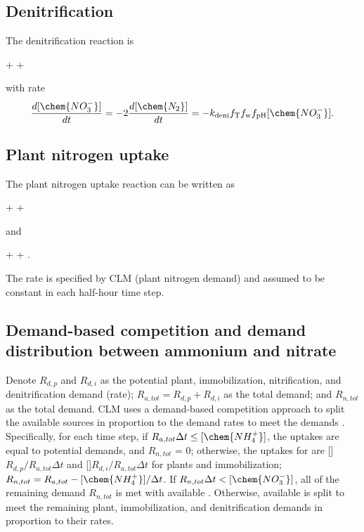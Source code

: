 \documentclass[gmd, manuscript]{copernicus}
\begin{document}
\subsection{Denitrification} 
The denitrification reaction is
\begin{reaction}
 + \cdots {}  + \cdots
\label{rxn:deni}
\end{reaction}
with rate \citep{Dickinson2002} 
\begin{equation} 
\frac{d [\chem{NO_3^-}]}{d t} = -2\frac{d
[\chem{N_2}]}{d t} = -k_\text{deni} f_\text{T} f_\text{w}
f_\text{pH}[\chem{NO_3^-}].
\label{eq:deni}
\end{equation}

\subsection{Plant nitrogen uptake}
The plant nitrogen uptake reaction can be written as
\begin{reaction}
 + \cdots \rightarrow {} + \cdots
\label{rxn:plantatake}
\end{reaction}
and
\begin{reaction}
 + \cdots \rightarrow {} + \cdots.
\label{rxn:plantntake}
\end{reaction}
The rate is specified by CLM (plant nitrogen demand) and assumed to be
constant in each half-hour time step. 

\subsection{Demand-based competition and demand distribution between ammonium and nitrate}
\label{sec:demandbasedcompetition}
Denote $R_{d,p}$ and $R_{d,i}$ as the potential plant,
immobilization, nitrification, and denitrification demand (rate);
$R_{a,tot}=R_{d,p}+R_{d,i}$ as the total  demand; and
$R_{n,tot}$ as the total  demand. CLM uses a demand-based
competition approach to split the available sources in proportion to the demand
rates to meet the demands \citep{Oleson2013,Thornton2005}. Specifically, for
each time step, if $R_{a,tot}\Delta t \leq [\chem{NH_4^+}]$, the uptakes are
equal to potential demands, and $R_{n,tot}$ = 0; otherwise, the uptakes for
 are []$R_{d,p}/R_{a,tot}\Delta t$ and
[]$R_{d,i}/R_{a,tot}\Delta t$ for plants and immobilization; $R_{n,tot}=R_{a,tot}-[\chem{NH_4^+}]/\Delta t$. If $R_{n,tot}\Delta t < [\chem{NO_3^-}]$, all of the remaining
demand $R_{n,tot}$ is met with available . Otherwise, available
 is split to meet the remaining plant, immobilization, and
denitrification demands in proportion to their rates. 
\end{document}
